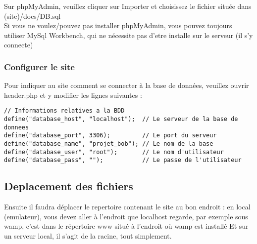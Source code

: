 	Sur phpMyAdmin, veuillez cliquer sur Importer et choisissez le fichier située dans (site)/docs/DB.sql\\
	
	Si vous ne voulez/pouvez pas installer phpMyAdmin, vous pouvez toujours utiliser MySql Workbench, qui ne nécessite pas d'etre installe sur le serveur (il s'y connecte)
	
	\subsubsection{Configurer le site}
	
	Pour indiquer au site comment se connecter à la base de données, veuillez ouvrir header.php et y modifier les lignes suivantes :
	\lstset{language=PHP}
	\begin{lstlisting}
// Informations relatives a la BDD
define("database_host", "localhost");  // Le serveur de la base de donnees
define("database_port", 3306);         // Le port du serveur 
define("database_name", "projet_bob"); // Le nom de la base
define("database_user", "root");       // Le nom d'utilisateur
define("database_pass", "");           // Le passe de l'utilisateur
	\end{lstlisting}
	
\subsection{Deplacement des fichiers}
	
	Ensuite il faudra déplacer le repertoire contenant le site au bon endroit : en local (emulateur), vous devez aller à l'endroit que localhost regarde, par exemple sous wamp, c'est dans le répertoire www situé à l'endroit où wamp est installé
	Et sur un serveur local, il s'agit de la racine, tout simplement.